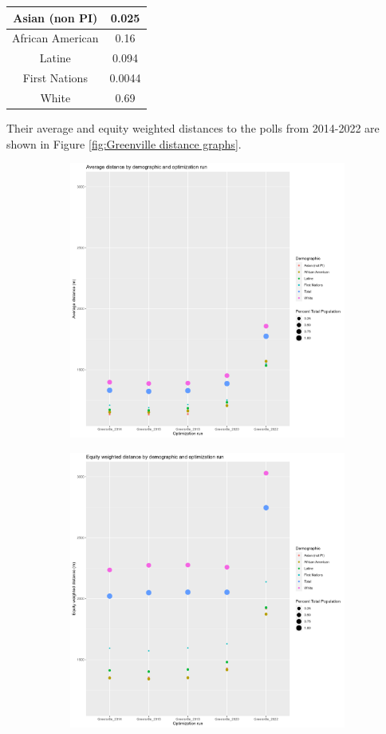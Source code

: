 \documentclass[11pt]{article}
\theoremstyle{remark}
\theoremstyle{definition}
\begin{document}
\begin{tabular} {| c | c |} 
	\hline
	Asian (non PI) &  0.025 \\ \hline
	African American & 0.16 \\ \hline
	Latine & 0.094 \\ \hline
	First Nations & 0.0044 \\ \hline
	White  & 0.69 \\ \hline
\end{tabular}


Their average and equity weighted distances to the polls from 2014-2022 are shown in Figure \ref{fig:Greenville distance graphs}.

\begin{figure}
	\begin{subfigure}{.8\textwidth}
		\centering
		\includegraphics[width=.8\linewidth]{result_analysis/Greenville_County_SC_original_configs/orig_pop_scaled_avg}
		\label{sfig:Greenville avg dist}
	\end{subfigure} \newline
	\begin{subfigure}{.8\textwidth}
		\centering
		\includegraphics[width=.8\linewidth]{result_analysis/Greenville_County_SC_original_configs/orig_pop_scaled_y_EDE}

\end{subfigure}
\end{figure}
\end{document}
